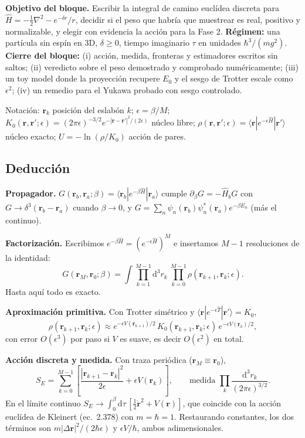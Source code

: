 \documentclass[11pt]{article}
\newcommand{\dd}{\mathrm{d}}
\begin{document}
\textbf{Objetivo del bloque.} Escribir la integral de camino euclídea discreta para $\hat H=-\tfrac12\nabla^2-e^{-\delta r}/r$, decidir si el peso que habría que muestrear es real, positivo y normalizable, y elegir con evidencia la acción para la Fase 2. \textbf{Régimen:} una partícula sin espín en 3D, $\delta\ge0$, tiempo imaginario $\tau$ en unidades $\hbar^3/(mg^2)$. \textbf{Cierre del bloque:} (i) acción, medida, fronteras y estimadores escritos sin saltos; (ii) veredicto sobre el peso demostrado y comprobado numéricamente; (iii) un toy model donde la proyección recupere $E_0$ y el sesgo de Trotter escale como $\epsilon^2$; (iv) un remedio para el Yukawa probado con sesgo controlado.

Notación: $\mathbf r_k$ posición del eslabón $k$; $\epsilon=\beta/M$; $K_0(\mathbf r,\mathbf r';\epsilon)=(2\pi\epsilon)^{-3/2}e^{-|\mathbf r-\mathbf r'|^2/(2\epsilon)}$ núcleo libre; $\rho(\mathbf r,\mathbf r';\epsilon)=\langle\mathbf r|e^{-\epsilon\hat H}|\mathbf r'\rangle$ núcleo exacto; $U=-\ln(\rho/K_0)$ acción de pares.

\subsection{Deducción}

\textbf{Propagador.} $G(\mathbf r_b,\mathbf r_a;\beta)=\langle\mathbf r_b|e^{-\beta\hat H}|\mathbf r_a\rangle$ cumple $\partial_\beta G=-\hat H_bG$ con $G\to\delta^3(\mathbf r_b-\mathbf r_a)$ cuando $\beta\to0$, y $G=\sum_n\psi_n(\mathbf r_b)\psi_n^*(\mathbf r_a)e^{-\beta E_n}$ (más el continuo).

\textbf{Factorización.} Escribimos $e^{-\beta\hat H}=(e^{-\epsilon\hat H})^M$ e insertamos $M-1$ resoluciones de la identidad:
\[
G(\mathbf r_M,\mathbf r_0;\beta)=\int\prod_{k=1}^{M-1}\dd^3r_k\ \prod_{k=0}^{M-1}\rho(\mathbf r_{k+1},\mathbf r_k;\epsilon).
\]
Hasta aquí todo es exacto.

\textbf{Aproximación primitiva.} Con Trotter simétrico y $\langle\mathbf r|e^{-\epsilon\hat T}|\mathbf r'\rangle=K_0$,
\[
\rho(\mathbf r_{k+1},\mathbf r_k;\epsilon)\approx e^{-\epsilon V(\mathbf r_{k+1})/2}\,K_0(\mathbf r_{k+1},\mathbf r_k;\epsilon)\,e^{-\epsilon V(\mathbf r_k)/2},
\]
con error $O(\epsilon^3)$ por paso si $V$ es suave, es decir $O(\epsilon^2)$ en total.

\textbf{Acción discreta y medida.} Con traza periódica ($\mathbf r_M\equiv\mathbf r_0$),
\[
S_E=\sum_{k=0}^{M-1}\left[\frac{|\mathbf r_{k+1}-\mathbf r_k|^2}{2\epsilon}+\epsilon V(\mathbf r_k)\right],\qquad \text{medida }\prod_k\frac{\dd^3r_k}{(2\pi\epsilon)^{3/2}}.
\]
En el límite continuo $S_E\to\int_0^\beta\dd\tau\,[\tfrac12\dot{\mathbf r}^2+V(\mathbf r)]$, que coincide con la acción euclídea de Kleinert (ec.~2.378) con $m=\hbar=1$. Restaurando constantes, los dos términos son $m|\Delta\mathbf r|^2/(2\hbar\epsilon)$ y $\epsilon V/\hbar$, ambos adimensionales.
\end{document}
